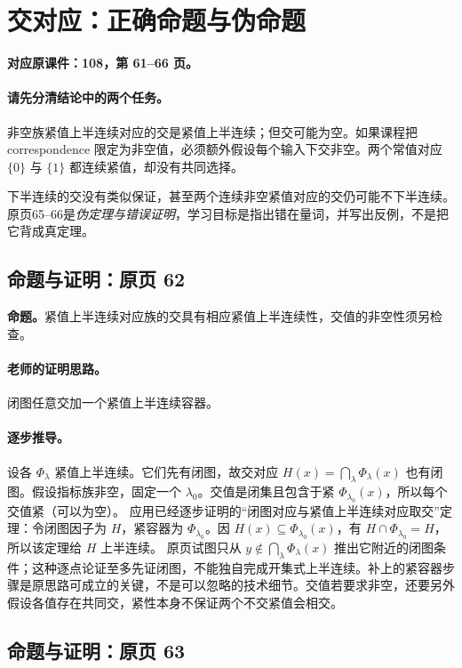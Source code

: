 \documentclass[11pt,a4paper]{article}
\theoremstyle{definition}\newtheorem{definition}{定义}\newtheorem{example}{例}
\begin{document}
\clearpage\section{交对应：正确命题与伪命题}\label{g:108:61}

\textbf{对应原课件：108，第 61--66 页。}


\paragraph{请先分清结论中的两个任务。}
非空族紧值上半连续对应的交是紧值上半连续；但交可能为空。如果课程把 correspondence 限定为非空值，必须额外假设每个输入下交非空。两个常值对应 $\{0\}$ 与 $\{1\}$ 都连续紧值，却没有共同选择。

下半连续的交没有类似保证，甚至两个连续非空紧值对应的交仍可能不下半连续。原页65--66是\emph{伪定理与错误证明}，学习目标是指出错在量词，并写出反例，不是把它背成真定理。


\subsection{命题与证明：原页 62}

\textbf{命题。}紧值上半连续对应族的交具有相应紧值上半连续性，交值的非空性须另检查。

\paragraph{老师的证明思路。}闭图任意交加一个紧值上半连续容器。

\paragraph{逐步推导。}
设各 $\Phi_\lambda$ 紧值上半连续。它们先有闭图，故交对应 $H(x)=\bigcap_\lambda\Phi_\lambda(x)$ 也有闭图。假设指标族非空，固定一个 $\lambda_0$。交值是闭集且包含于紧 $\Phi_{\lambda_0}(x)$，所以每个交值紧（可以为空）。
应用已经逐步证明的“闭图对应与紧值上半连续对应取交”定理：令闭图因子为 $H$，紧容器为 $\Phi_{\lambda_0}$。因 $H(x)\subseteq\Phi_{\lambda_0}(x)$，有 $H\cap\Phi_{\lambda_0}=H$，所以该定理给 $H$ 上半连续。
原页试图只从 $y\notin\bigcap_\lambda\Phi_\lambda(x)$ 推出它附近的闭图条件；这种逐点论证至多先证闭图，不能独自完成开集式上半连续。补上的紧容器步骤是原思路可成立的关键，不是可以忽略的技术细节。交值若要求非空，还要另外假设各值存在共同交，紧性本身不保证两个不交紧值会相交。


\subsection{命题与证明：原页 63}
\end{document}
